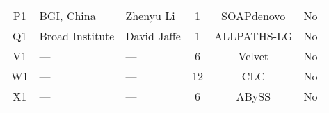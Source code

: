 \begin{table}
\begin{center}
\begin{tabular}{| c | p{1.5in} | l | c | c | l |}
      P1   &  BGI, China &  Zhenyu Li &  1 &  SOAPdenovo & No \\
      Q1 &  Broad Institute &  David Jaffe &  1 &  ALLPATHS-LG & No\\
      \hline\hline
      V1  &  --- &  --- &   6 & Velvet & No \\
      W1   &  --- &  --- &  12 & CLC & No \\
      X1 &  --- &  --- &   6 & ABySS & No\\
      \hline
    \end{tabular}
  \end{center}
  \label{table:participants}
\end{table}
